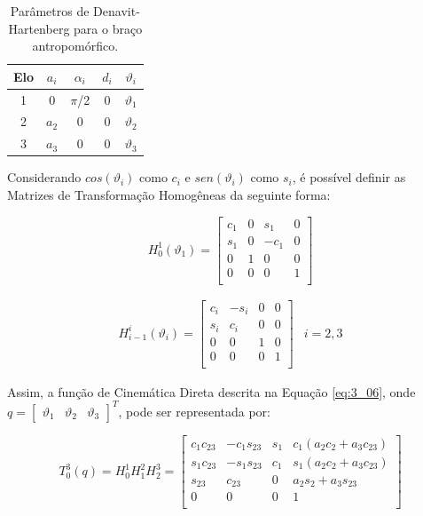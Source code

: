\begin{table}[h!]
\centering
\begin{tabular}{c|c|c|c|c}
 \hline
 Elo & $a_i$ & $\alpha_i$ & $d_i$ & $\vartheta_i$ \\ [0.5ex] 
 \hline\hline
 1 & 0 & $\pi$/2 & 0 & $\vartheta_1$ \\ 
 2 & $a_2$ & 0 & 0 & $\vartheta_2$ \\ 
 3 & $a_3$ & 0 & 0 & $\vartheta_3$ \\ 
 \hline
\end{tabular}
\caption{Parâmetros de Denavit-Hartenberg para o braço antropomórfico.}
\label{table:3_01}
\end{table}

Considerando $cos(\vartheta_i)$ como $c_i$ e $sen(\vartheta_i)$ como $s_i$, é possível definir as Matrizes de Transformação Homogêneas da seguinte forma:

\begin{equation}
H_0^1 (\vartheta_1) = 
\begin{bmatrix}
c_1 & 0 & s_1 & 0 \\
s_1 & 0 & -c_1 & 0 \\
0 & 1 & 0 & 0 \\
0 & 0 & 0 & 1 \\
\end{bmatrix} 
\label{eq:3_07}
\end{equation}

\begin{equation}
\begin{matrix}
H_{i-1}^i (\vartheta_i) = 
\begin{bmatrix}
c_i & -s_i & 0 & 0 \\
s_i & c_i & 0 & 0 \\
0 & 0 & 1 & 0 \\
0 & 0 & 0 & 1 \\
\end{bmatrix} & i = 2,3
\end{matrix}
\label{eq:3_08}
\end{equation}

Assim, a função de Cinemática Direta descrita na Equação \ref{eq:3_06}, onde $q = \begin{bmatrix}\vartheta_1 & \vartheta_2 & \vartheta_3\end{bmatrix}^T$, pode ser representada por:

\begin{equation}
T_0^3 (q) = 
H_0^1 H_1^2 H_2^3 = 
\begin{bmatrix}
c_1 c_{23} & -c_1 s_{23} & s_1 & c_1(a_2 c_2 + a_3 c_{23}) \\
s_1 c_{23} & -s_1 s_{23} & c_1 & s_1(a_2 c_2 + a_3 c_{23}) \\
s_{23} & c_{23} & 0 & a_2 s_2 + a_3 s_{23} \\
0 & 0 & 0 & 1 \\
\end{bmatrix} 
\label{eq:3_09}
\end{equation}

